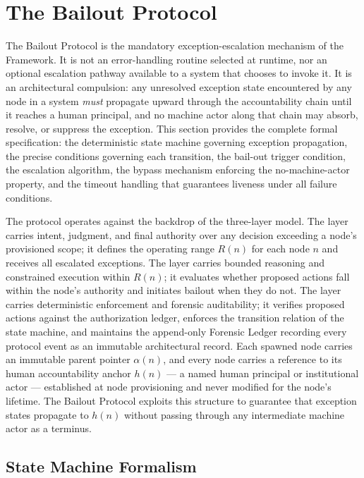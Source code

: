 \section{The Bailout Protocol}\label{sec:bailout}

The Bailout Protocol is the mandatory exception-escalation mechanism of the \bxthree{} Framework. It is not an error-handling routine selected at runtime, nor an optional escalation pathway available to a system that chooses to invoke it. It is an architectural compulsion: any unresolved exception state encountered by any node in a \bxthree{} system \emph{must} propagate upward through the accountability chain until it reaches a human principal, and no machine actor along that chain may absorb, resolve, or suppress the exception. This section provides the complete formal specification: the deterministic state machine governing exception propagation, the precise conditions governing each transition, the bail-out trigger condition, the escalation algorithm, the bypass mechanism enforcing the no-machine-actor property, and the timeout handling that guarantees liveness under all failure conditions.

The protocol operates against the backdrop of the \bxthree{} three-layer model. The \purpose{} layer carries intent, judgment, and final authority over any decision exceeding a node's provisioned scope; it defines the operating range $R(n)$ for each node $n$ and receives all escalated exceptions. The \bounds{} layer carries bounded reasoning and constrained execution within $R(n)$; it evaluates whether proposed actions fall within the node's authority and initiates bailout when they do not. The \fact{} layer carries deterministic enforcement and forensic auditability; it verifies proposed actions against the authorization ledger, enforces the transition relation of the state machine, and maintains the append-only Forensic Ledger recording every protocol event as an immutable architectural record. Each spawned node carries an immutable parent pointer $\alpha(n)$, and every node carries a reference to its human accountability anchor $h(n)$ — a named human principal or institutional actor — established at node provisioning and never modified for the node's lifetime. The Bailout Protocol exploits this structure to guarantee that exception states propagate to $h(n)$ without passing through any intermediate machine actor as a terminus.

\subsection{State Machine Formalism}\label{sec:state-machine}

